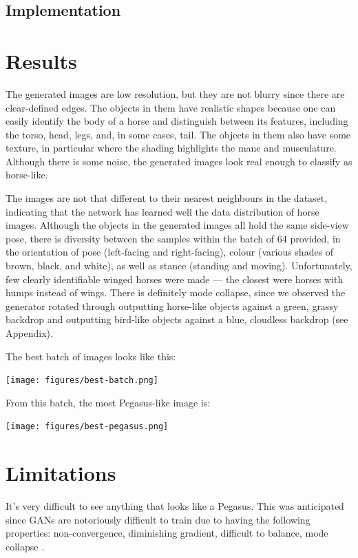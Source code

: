 \documentclass{article}
\begin{document}
\subsection{Implementation}

\section{Results}
The generated images are low resolution, but they are not blurry since there are clear-defined edges. The objects in them have realistic shapes because one can easily identify the body of a horse and distinguish between its features, including the torso, head, legs, and, in some cases, tail. The objects in them also have some texture, in particular where the shading highlights the mane and musculature. Although there is some noise, the generated images look real enough to classify as horse-like. 

The images are not that different to their nearest neighbours in the dataset, indicating that the network has learned well the data distribution of horse images. Although the objects in the generated images all hold the same side-view pose, there is diversity between the samples within the batch of 64 provided, in the orientation of pose (left-facing and right-facing), colour (various shades of brown, black, and white), as well as stance (standing and moving). Unfortunately, few clearly identifiable winged horses were made --- the closest were horses with humps instead of wings. There is definitely mode collapse, since we observed the generator rotated through outputting horse-like objects against a green, grassy backdrop and outputting bird-like objects against a blue, cloudless backdrop (see Appendix). 

The best batch of images looks like this:
\begin{center}
    \texttt{[image: figures/best-batch.png]}
\end{center}

From this batch, the most Pegasus-like image is:
\begin{center}
    \texttt{[image: figures/best-pegasus.png]}
\end{center}

\section{Limitations}
It's very difficult to see anything that looks like a Pegasus. This was anticipated since GANs are notoriously difficult to train due to having the following properties: non-convergence, diminishing gradient, difficult to balance, mode collapse \cite{}. 
\end{document}
